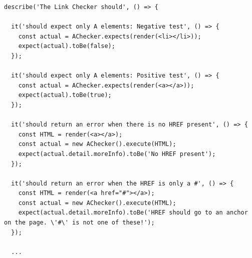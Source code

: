 \begin{lstlisting}
describe('The Link Checker should', () => {

  it('should expect only A elements: Negative test', () => {
    const actual = AChecker.expects(render(<li></li>));
    expect(actual).toBe(false);
  });

  it('should expect only A elements: Positive test', () => {
    const actual = AChecker.expects(render(<a></a>));
    expect(actual).toBe(true);
  });

  it('should return an error when there is no HREF present', () => {
    const HTML = render(<a></a>);
    const actual = new AChecker().execute(HTML);
    expect(actual.detail.moreInfo).toBe('No HREF present');
  });

  it('should return an error when the HREF is only a #', () => {
    const HTML = render(<a href="#"></a>);
    const actual = new AChecker().execute(HTML);
    expect(actual.detail.moreInfo).toBe('HREF should go to an anchor on the page. \'#\' is not one of these!');
  });

  ...
\end{lstlisting}


%
%
%
%
